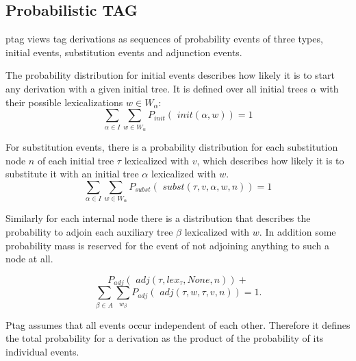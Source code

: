 \subsection{Probabilistic TAG}
\label{ssec:probmodels}
{\sc ptag} \cite{resnik1992} views {\sc tag} derivations as sequences of probability events of three types, initial events, substitution events and adjunction events.

\newcommand{\adj}[0]{\textit{ adj}}
\newcommand{\init}[0]{\textit{ init}}
\newcommand{\subst}[0]{\textit{ subst}}
The probability distribution for initial events describes how likely it is to start any derivation with a given initial tree. 
It is defined over all initial trees $\alpha$ with their possible lexicalizations $w \in W_\alpha$: 
$$ \sum\limits_{\alpha \in I}\sum\limits_{w \in W_\alpha} P_{init}(\init(\alpha, w)) = 1 $$

For substitution events, there is a probability distribution for each substitution node $n$ of each initial tree $\tau$ lexicalized with $v$, which describes how likely it is to substitute it with an initial tree $\alpha$ lexicalized with $w$. 
$$\sum\limits_{\alpha \in I}\sum\limits_{w \in W_\alpha} P_{subst}(\subst(\tau,v , \alpha, w, n)) = 1$$

Similarly for each internal node there is a distribution that describes the probability to adjoin each auxiliary tree $\beta$ lexicalized with $w$. In addition some probability mass is reserved for the event of not adjoining anything to such a node at all.

$$ P_{adj}(\adj(\tau, lex_\tau, \textit{None},n)) +$$
$$ \sum\limits_{\beta \in A}\sum\limits_{w_\beta} P_{adj}(\adj(\tau, w, \tau, v, n)) = 1.$$

{\sc Ptag} assumes that all events occur independent of each other. Therefore it defines the total probability for a derivation as the product of the probability of its individual events. 

